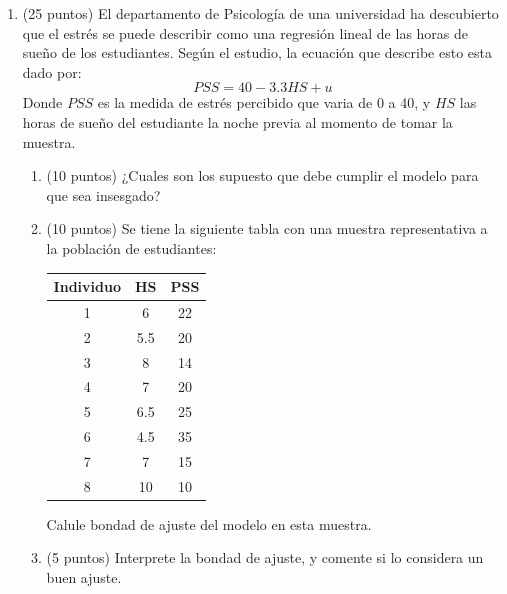 \documentclass[10pt,a4paper]{article}
\begin{document}
\begin{enumerate}
\begin{enumerate}
    \item (10 puntos) Demuestre que este efecto de atenuación \textbf{no} proviene del error de medición en $Y$.
    
\end{enumerate}




\item (25 puntos) El departamento de Psicología de una universidad ha descubierto que el estrés se puede describir como una regresión lineal de las horas de sueño de los estudiantes. Según el estudio, la ecuación que describe esto esta dado por:
$$PSS=40 - 3.3HS + u$$
Donde $PSS$ es la medida de estrés percibido que varia de 0 a 40, y $HS$ las horas de sueño del estudiante la noche previa al momento de tomar la muestra. 

\begin{enumerate}
    \item (10 puntos) ¿Cuales son los supuesto que debe cumplir el modelo para que sea insesgado?
      
    \item (10 puntos) Se tiene la siguiente tabla con una muestra representativa a la población de estudiantes:
    \begin{center}
        \begin{table}[H]
            \centering
            \begin{tabular}{|c|c|c|}
            \hline
                Individuo & HS & PSS \\
                \hline 
                1         & 6   &  22   \\
                2         & 5.5 &  20   \\
                3         & 8   &  14   \\
                4         & 7   &  20   \\
                5         & 6.5 &  25   \\
                6         & 4.5 &  35   \\
                7         & 7   &  15   \\
                8         & 10  &  10   \\
                \hline
            \end{tabular}
        \end{table}
    \end{center}
    Calule bondad de ajuste del modelo en esta muestra.
    
    \item (5 puntos) Interprete la bondad de ajuste, y comente si lo considera un buen ajuste.


\end{enumerate}
\end{enumerate}
\end{document}
